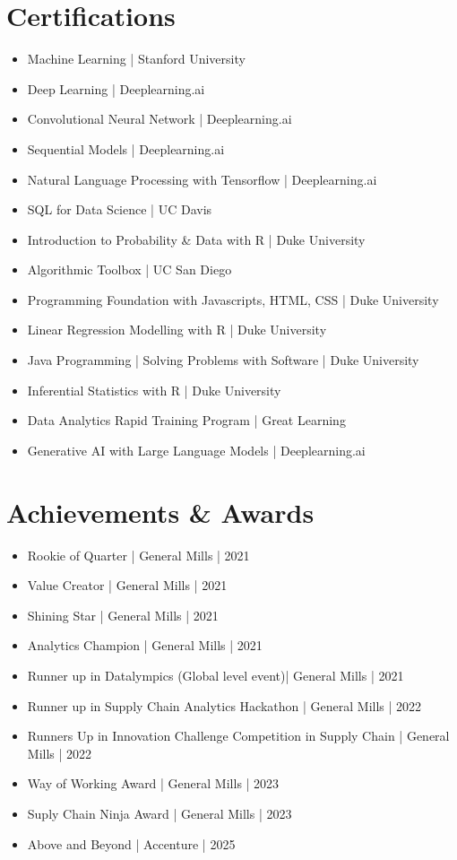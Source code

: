 \documentclass[a4paper,10pt]{article}
\begin{document}
\section*{Certifications}
\begin{itemize}
    \item Machine Learning | Stanford University
    \item Deep Learning | Deeplearning.ai
    \item Convolutional Neural Network | Deeplearning.ai
    \item Sequential Models | Deeplearning.ai
    \item Natural Language Processing with Tensorflow | Deeplearning.ai
    \item SQL for Data Science | UC Davis
    \item Introduction to Probability \& Data with R | Duke University
    \item Algorithmic Toolbox | UC San Diego
    \item Programming Foundation with Javascripts, HTML, CSS | Duke University
    \item Linear Regression Modelling with R | Duke University
    \item Java Programming | Solving Problems with Software | Duke University
    \item Inferential Statistics with R | Duke University
    \item Data Analytics Rapid Training Program | Great Learning
    \item Generative AI with Large Language Models | Deeplearning.ai 
\end{itemize}

\section*{Achievements \& Awards}
\begin{itemize}
    \item Rookie of Quarter | General Mills | 2021
    \item Value Creator | General Mills | 2021
    \item Shining Star | General Mills | 2021
    \item Analytics Champion | General Mills | 2021
    \item Runner up in Datalympics (Global level event)| General Mills | 2021
    \item Runner up in Supply Chain Analytics Hackathon | General Mills | 2022
    \item Runners Up in Innovation Challenge Competition in Supply Chain | General Mills | 2022
    \item Way of Working Award | General Mills | 2023
    \item Suply Chain Ninja Award | General Mills | 2023
    \item Above and Beyond | Accenture | 2025
\end{itemize}
\end{document}
